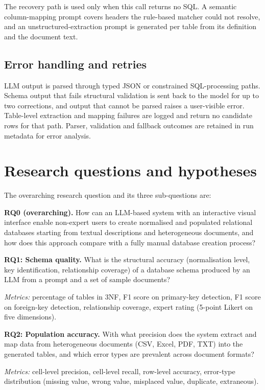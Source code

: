 \documentclass[11pt,a4paper]{article}
\begin{document}
The recovery path is used only when this call returns no SQL. A semantic column-mapping prompt covers headers the rule-based matcher could not resolve, and an unstructured-extraction prompt is generated per table from its definition and the document text.

\subsection{Error handling and retries}
LLM output is parsed through typed JSON or constrained SQL-processing paths. Schema output that fails structural validation is sent back to the model for up to two corrections, and output that cannot be parsed raises a user-visible error. Table-level extraction and mapping failures are logged and return no candidate rows for that path. Parser, validation and fallback outcomes are retained in run metadata for error analysis.

\section{Research questions and hypotheses}
\label{sec:rq}
The overarching research question and its three sub-questions are:

\bigskip
\noindent\textbf{RQ0 (overarching).} How can an LLM-based system with an interactive visual interface enable non-expert users to create normalised and populated relational databases starting from textual descriptions and heterogeneous documents, and how does this approach compare with a fully manual database creation process?

\bigskip
\noindent\textbf{RQ1: Schema quality.} What is the structural accuracy (normalisation level, key identification, relationship coverage) of a database schema produced by an LLM from a prompt and a set of sample documents?

\noindent\textit{Metrics:} percentage of tables in 3NF, F1 score on primary-key detection, F1 score on foreign-key detection, relationship coverage, expert rating (5-point Likert on five dimensions).

\bigskip
\noindent\textbf{RQ2: Population accuracy.} With what precision does the system extract and map data from heterogeneous documents (CSV, Excel, PDF, TXT) into the generated tables, and which error types are prevalent across document formats?

\noindent\textit{Metrics:} cell-level precision, cell-level recall, row-level accuracy, error-type distribution (missing value, wrong value, misplaced value, duplicate, extraneous).
\end{document}
